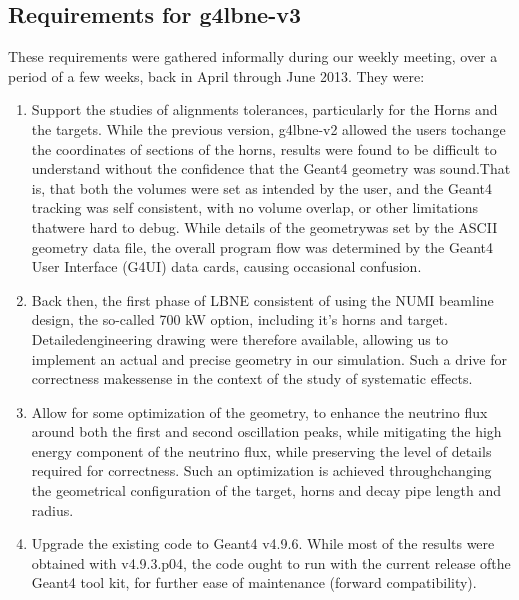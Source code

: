 \subsection{Requirements for  g4lbne-v3}  These requirements were gathered informally during our weekly meeting, over a period of a few weeks, back in April through June 2013. They were:  \begin{enumerate}\item Support the studies of alignments tolerances, particularly for the Horns and the targets.  While the previous version, g4lbne-v2 allowed the users tochange the coordinates of sections of the horns, results were found to be difficult to understand without the confidence that the Geant4 geometry was sound.That is, that both the volumes were set as intended by the user, and the Geant4 tracking was self consistent, with no volume overlap, or other limitations thatwere hard to debug.  While details of the geometrywas set by the ASCII geometry data file, the overall program flow was determined by the Geant4 User Interface (G4UI) data cards, causing occasional confusion. \item Back then, the first phase of LBNE consistent of using the NUMI beamline design, the so-called 700 kW option, including it's horns and target. Detailedengineering drawing were therefore available, allowing us to implement an actual and precise geometry in our simulation. Such a drive for correctness makessense in the context of the study of systematic effects. \item Allow for some optimization of the geometry, to enhance the neutrino flux around both the first and second oscillation peaks, while mitigating the high energy component of the neutrino flux, while preserving the level of details required for correctness. Such an optimization is achieved throughchanging the geometrical configuration of the target, horns and decay pipe length and radius.  \item Upgrade the existing code to Geant4 v4.9.6.  While most of the results were obtained with v4.9.3.p04, the code ought to run with the current release ofthe Geant4 tool kit, for further ease of maintenance (forward compatibility).  \end{enumerate} 

